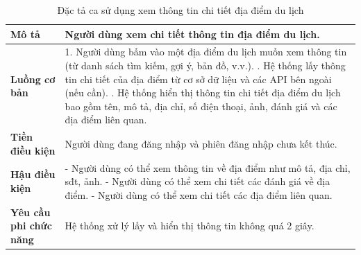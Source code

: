 \begin{longtable}{| p{4cm} | p{\dimexpr\linewidth-4cm-4\tabcolsep} |} %
    \caption{Đặc tả ca sử dụng xem thông tin chi tiết địa điểm du lịch} %
    \label{tab:uc_view_place_details_spec} \\ %

    \hline
    \textbf{Mô tả} & Người dùng xem chi tiết thông tin địa điểm du lịch. \\
    \hline
    \endfirsthead %



    \hline %
    \endlastfoot

    \textbf{Luồng cơ bản} & 1. Người dùng bấm vào một địa điểm du lịch muốn xem thông tin (từ danh sách tìm kiếm, gợi ý, bản đồ, v.v.). \newline
                           2. Hệ thống lấy thông tin chi tiết của địa điểm từ cơ sở dữ liệu và các API bên ngoài (nếu cần). \newline
                           3. Hệ thống hiển thị thông tin chi tiết địa điểm du lịch bao gồm tên, mô tả, địa chỉ, số điện thoại, ảnh, đánh giá và các địa điểm liên quan. \\
    \hline
    \textbf{Tiền điều kiện} & Người dùng đang đăng nhập và phiên đăng nhập chưa kết thúc. \\
    \hline
    \textbf{Hậu điều kiện} & - Người dùng có thể xem thông tin về địa điểm như mô tả, địa chỉ, sđt, ảnh. \newline
                           - Người dùng có thể xem chi tiết các đánh giá về địa điểm. \newline
                           - Người dùng có thể xem chi tiết các địa điểm liên quan. \\
    \hline
    \textbf{Yêu cầu phi chức năng} & Hệ thống xử lý lấy và hiển thị thông tin không quá 2 giây. \\

\end{longtable}
\vspace{0.8cm}

